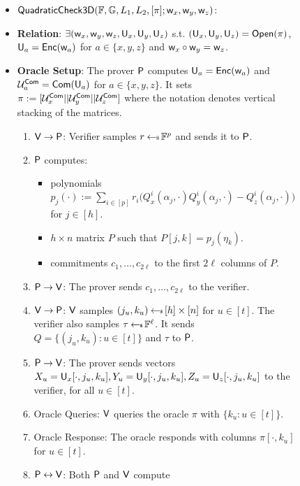 \begin{figure}[h!]
\centering
\begin{framed}
\begin{itemize}
\item $\mathsf{QuadraticCheck3D}(\mathbb{F},\mathbb{G},L_1,L_2,[\pi];\mathsf{w}_x,\mathsf{w}_y,\mathsf{w}_z)$:
\item {\bf Relation}: $\exists (\mathsf{w}_x,\mathsf{w}_y,\mathsf{w}_z,\mathsf{U}_x,\mathsf{U}_y,\mathsf{U}_z)$
s.t. $(\mathsf{U}_x,\mathsf{U}_y,\mathsf{U}_z)=\mathsf{Open}(\pi)$, $\mathsf{U}_{a}=\mathsf{Enc}(\mathsf{w}_a)$ for $a\in
\{x,y,z\}$ and $\mathsf{w}_x\circ \mathsf{w}_y = \mathsf{w}_z$.
\item {\bf Oracle Setup}: The prover $\mathsf{P}$ computes $\mathsf{U}_a=\mathsf{Enc}(\mathsf{w}_a)$
and $\mathcal{U}^{\mathsf{Com}}_a=\mathsf{Com}(\mathsf{U}_a)$ for $a\in \{x,y,z\}$. It sets $\pi :=
[\mathcal{U}^{\mathsf{Com}}_x||\mathcal{U}^{\mathsf{Com}}_y||\mathcal{U}^{\mathsf{Com}}_z]$ where the notation denotes vertical
stacking of the matrices. 
\begin{enumerate}[{\rm 1.}]
\item $\mathsf{V}\rightarrow\mathsf{P}$: Verifier samples $r\hskip2.3pt{\gets\!\!\mbox{\tiny${\$}$\normalsize}}\,\mathbb{F}^p$ and sends
it to $\mathsf{P}$.
\item $\mathsf{P}$ computes:
	\begin{itemize}
	\item polynomials $p_j(\cdot):=\sum_{i\in
[p]}r_i\big(Q^i_x(\alpha_j,\cdot)Q^i_y(\alpha_j,\cdot)-Q^i_z(\alpha_j,\cdot)\big)$
for $j\in [h]$.
	\item $h\times n$ matrix $P$ such that $P[j,k]=p_j(\eta_k)$.
	\item commitments $c_1,\ldots,c_{2\ell}$ to the first $2\ell$ columns of
$P$.
	\end{itemize}
\item $\mathsf{P}\rightarrow\mathsf{V}$: The prover sends $c_1,\ldots,c_{2\ell}$ to
the verifier.
\item $\mathsf{V}\rightarrow\mathsf{P}$: $\mathsf{V}$ samples $(j_u,k_u)\hskip2.3pt{\gets\!\!\mbox{\tiny${\$}$\normalsize}}\,
[h]\times [n]$ for $u\in [t]$. The verifier also samples $\tau\hskip2.3pt{\gets\!\!\mbox{\tiny${\$}$\normalsize}}\,
\mathbb{F}^{\ell}$. It sends $Q=\{(j_u,k_u):u\in [t]\}$ and $\tau$ to $\mathsf{P}$.
\item $\mathsf{P}\rightarrow\mathsf{V}$: The prover sends vectors
$X_u=\mathsf{U}_x[\cdot,j_u,k_u],Y_u=\mathsf{U}_y[\cdot,j_u,k_u],Z_u=\mathsf{U}_z[\cdot,j_u,k_u]$
to the verifier, for all $u\in [t]$.
\item Oracle Queries: $\mathsf{V}$ queries the oracle $\pi$ with $\{k_u: u\in
[t]\}$.
\item Oracle Response: The oracle responds with columns $\pi[\cdot,k_u]$ for
$u\in [t]$.
\item $\mathsf{P}\leftrightarrow\mathsf{V}$: Both $\mathsf{P}$ and $\mathsf{V}$ compute

\end{enumerate}
\end{itemize}
\end{framed}
\end{figure}
